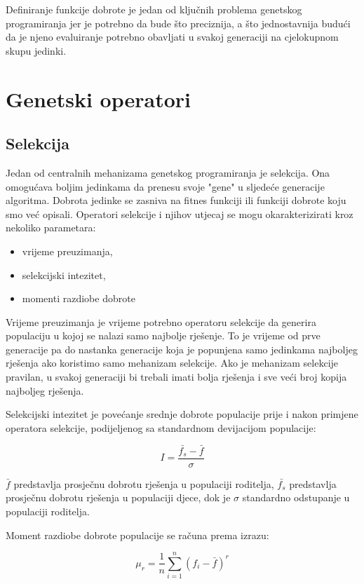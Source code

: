\documentclass[times, utf8, zavrsni]{fer}
\begin{document}
Definiranje funkcije dobrote je jedan od ključnih problema genetskog programiranja jer je potrebno da bude što preciznija, a što jednostavnija budući da je njeno evaluiranje potrebno obavljati u svakoj generaciji na cjelokupnom skupu jedinki. 

\section{Genetski operatori}

\subsection{Selekcija}
Jedan od centralnih mehanizama genetskog programiranja je selekcija. Ona omogućava boljim jedinkama da prenesu svoje "gene" u sljedeće generacije algoritma. Dobrota jedinke se zasniva na fitnes funkciji ili funkciji dobrote koju smo već opisali. Operatori selekcije i njihov utjecaj se mogu okarakterizirati kroz nekoliko parametara:

\begin{itemize}
\item{vrijeme preuzimanja,}
\item{selekcijski intezitet,}
\item{momenti razdiobe dobrote}
\end{itemize}

Vrijeme preuzimanja je vrijeme potrebno operatoru selekcije da generira populaciju u kojoj se nalazi samo najbolje rješenje. To je vrijeme od prve generacije pa do nastanka generacije koja je popunjena samo jedinkama najboljeg rješenja ako koristimo samo mehanizam selekcije. Ako je mehanizam selekcije pravilan, u svakoj generaciji bi trebali imati bolja rješenja i sve veći broj kopija najboljeg rješenja.

Selekcijski intezitet je povećanje srednje dobrote populacije prije i nakon primjene operatora selekcije, podijeljenog sa standardnom devijacijom populacije:

\[ I = \frac{\bar{f_s} - \bar{f}}{\sigma} \]

$\bar{f} $ predstavlja prosječnu dobrotu rješenja u populaciji roditelja,  $\bar{f_s} $ predstavlja prosječnu dobrotu rješenja u populaciji djece, dok je $\sigma$ standardno odstupanje u populaciji roditelja.

Moment razdiobe dobrote populacije se računa prema izrazu:

\[ \mu_r = \frac1{n}\sum_{i=1}^{n}(f_i - \bar{f})^r \]
\end{document}

